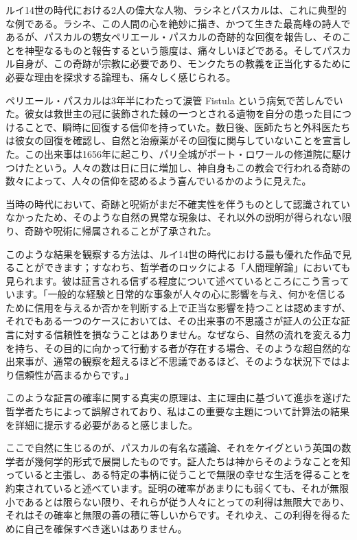 \documentclass[a4paper,11pt,openany]{ltjsbook}
\begin{document}
ルイ14世の時代における2人の偉大な人物、ラシネとパスカルは、これに典型的な例である。ラシネ、この人間の心を絶妙に描き、かつて生きた最高峰の詩人であるが、パスカルの甥女ペリエール・パスカルの奇跡的な回復を報告し、そのことを神聖なるものと報告するという態度は、痛々しいほどである。そしてパスカル自身が、この奇跡が宗教に必要であり、モンクたちの教義を正当化するために必要な理由を探求する論理も、痛々しく感じられる。

ペリエール・パスカルは3年半にわたって涙管 Fistula という病気で苦しんでいた。彼女は救世主の冠に装飾された棘の一つとされる遺物を自分の患った目につけることで、瞬時に回復する信仰を持っていた。数日後、医師たちと外科医たちは彼女の回復を確認し、自然と治療薬がその回復に関与していないことを宣言した。この出来事は1656年に起こり、パリ全城がポート・ロワールの修道院に駆けつけたという。人々の数は日に日に増加し、神自身もこの教会で行われる奇跡の数々によって、人々の信仰を認めるよう喜んでいるかのように見えた。

当時の時代において、奇跡と呪術がまだ不確実性を伴うものとして認識されていなかったため、そのような自然の異常な現象は、それ以外の説明が得られない限り、奇跡や呪術に帰属されることが了承された。

このような結果を観察する方法は、ルイ14世の時代における最も優れた作品で見ることができます；すなわち、哲学者のロックによる「人間理解論」においても見られます。彼は証言される信ずる程度について述べているところにこう言っています。「一般的な経験と日常的な事象が人々の心に影響を与え、何かを信じるために信用を与えるか否かを判断する上で正当な影響を持つことは認めますが、それでもある一つのケースにおいては、その出来事の不思議さが証人の公正な証言に対する信頼性を損なうことはありません。なぜなら、自然の流れを変える力を持ち、その目的に向かって行動する者が存在する場合、そのような超自然的な出来事が、通常の観察を超えるほど不思議であるほど、そのような状況下ではより信頼性が高まるからです。」

このような証言の確率に関する真実の原理は、主に理由に基づいて進歩を遂げた哲学者たちによって誤解されており、私はこの重要な主題について計算法の結果を詳細に提示する必要があると感じました。

ここで自然に生じるのが、パスカルの有名な議論、それをケイグという英国の数学者が幾何学的形式で展開したものです。証人たちは神からそのようなことを知っていると主張し、ある特定の事柄に従うことで無限の幸せな生活を得ることを約束されていると述べています。証明の確率があまりにも弱くても、それが無限小であるとは限らない限り、それらが従う人々にとっての利得は無限大であり、それはその確率と無限の善の積に等しいからです。それゆえ、この利得を得るために自己を確保すべき迷いはありません。
\end{document}
